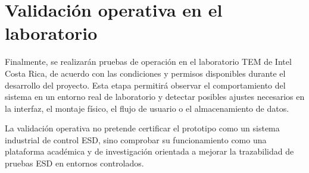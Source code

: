 \section{Validación operativa en el laboratorio}

Finalmente, se realizarán pruebas de operación en el laboratorio TEM de Intel Costa
Rica, de acuerdo con las condiciones y permisos disponibles durante el desarrollo del
proyecto. Esta etapa permitirá observar el comportamiento del sistema en un entorno real
de laboratorio y detectar posibles ajustes necesarios en la interfaz, el montaje físico, el
flujo de usuario o el almacenamiento de datos.

La validación operativa no pretende certificar el prototipo como un sistema industrial de
control ESD, sino comprobar su funcionamiento como una plataforma académica y de
investigación orientada a mejorar la trazabilidad de pruebas ESD en entornos controlados.



